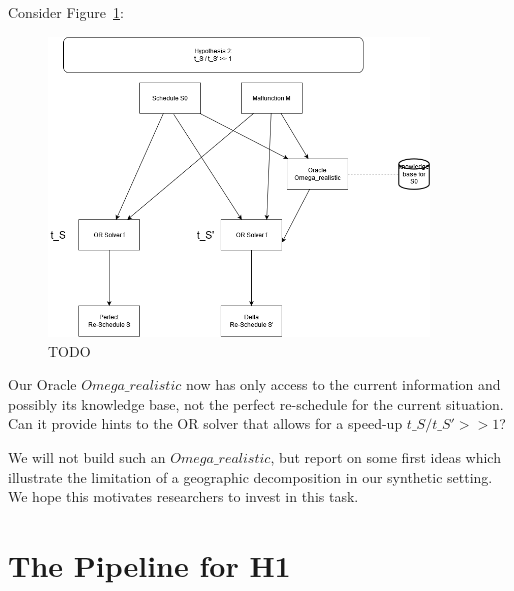 \documentclass{article}
\begin{document}
Consider Figure~\ref{fig:introduction_H2}:
%
\begin{figure}[hbtp]
	\centering
  \includegraphics[width=0.9\textwidth]{introduction_H2.png}
	\caption{TODO}
	\label{fig:introduction_H2}
\end{figure}
%
Our Oracle $Omega\_realistic$ now has only access to the current information and possibly its knowledge base, not the perfect re-schedule for the current situation. Can it provide hints to the OR solver that allows for a speed-up $t\_S / t\_S' >> 1$?

We will not build such an $Omega\_realistic$, but report on some first ideas which illustrate the limitation of a geographic decomposition in our synthetic setting. We hope this motivates researchers to invest in this task.



\section{The Pipeline for H1}




\end{document}
